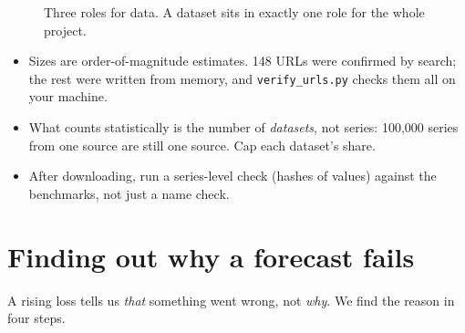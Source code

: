 \documentclass[10pt,a4paper]{article}
\begin{document}
\begin{figure}[H]
\centering
{}
\caption{Three roles for data. A dataset sits in exactly one role for the whole project.}
\end{figure}

\begin{keep}
\begin{itemize}
\item Sizes are order-of-magnitude estimates. 148 URLs were confirmed by search; the rest were written from memory, and \texttt{verify\_urls.py} checks them all on your machine.
\item What counts statistically is the number of \emph{datasets}, not series: 100,000 series from one source are still one source. Cap each dataset's share.
\item After downloading, run a series-level check (hashes of values) against the benchmarks, not just a name check.
\end{itemize}
\end{keep}

\section{Finding out why a forecast fails}

A rising loss tells us \emph{that} something went wrong, not \emph{why}. We find the reason in four steps.
\end{document}
